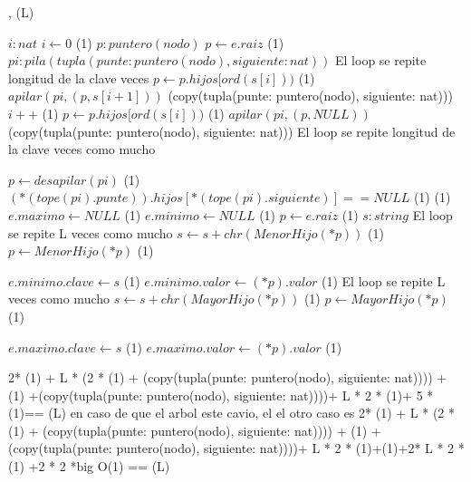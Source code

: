{   ,
    }
    {}
    {\bigo(L)}
{
	\var $i : nat$
	\State $ i \gets 0$  												\comment \bigo(1) 
	\var $p : puntero(nodo)$ 
	\State $ p \gets e.raiz$											\comment \bigo(1)  
	\var $pi: pila(tupla(punte: puntero(nodo), siguiente: nat))$ 
     	\Statex             \comment El loop se repite longitud de la clave veces
     	\State $p \gets p.hijos[ord(s[i]))$								\comment \bigo(1)
     	\State $apilar(pi, (p,s[i+1])) $								\comment \bigo(copy(tupla(punte: puntero(nodo), siguiente: nat))) 
     	\State $i++$   													\comment \bigo(1) 
    \EndWhile	
    \State $p \gets p.hijos[ord(s[i]))$								\comment \bigo(1)
     \State $apilar(pi, (p,NULL)) $							\comment \bigo(copy(tupla(punte: puntero(nodo), siguiente: nat)))	
     	\Statex             \comment El loop se repite longitud de la clave veces como mucho
 
     	\State $p \gets desapilar(pi)$								\comment \bigo(1)
     	  \State $(*(tope(pi).punte)).hijos[*(tope(pi).siguiente)] == NULL$							\comment \bigo(1)	
    \EndWhile	
                         			\comment \bigo(1)
		 	\State $e.maximo \gets NULL$							\comment \bigo(1)
	\State $e.minimo \gets NULL$							\comment \bigo(1)
	\Else
         \State $ p \gets e.raiz$	\comment \bigo(1)
         \var $s : string$ 
     		\Statex             \comment El loop se repite L veces como mucho
     		\State $s \gets s+chr(MenorHijo(*p))$								\comment \bigo(1)	
     		\State $p \gets MenorHijo(*p)$								\comment \bigo(1)	
     				
    	\EndWhile		
    	\State $e.minimo.clave \gets s$								\comment \bigo(1)	
    	\State $e.minimo.valor \gets (*p).valor$								\comment \bigo(1)	
     		\Statex             \comment El loop se repite L veces como mucho
     		\State $s \gets s+chr(MayorHijo(*p))$								\comment \bigo(1)	
     		\State $p \gets MayorHijo(*p)$								\comment \bigo(1)	
     				
    	\EndWhile		
    	\State $e.maximo.clave \gets s$								\comment \bigo(1)	
    	\State $e.maximo.valor \gets (*p).valor$								\comment \bigo(1)	
    	
     \EndIf	 	
												 

}	{  2* \bigo(1) + L * (2 * \bigo(1) + \bigo(copy(tupla(punte: puntero(nodo), siguiente: nat)))) + \bigo(1) +\bigo(copy(tupla(punte: puntero(nodo), siguiente: nat))))+ L * 2 * \bigo(1)+ 5 * \bigo(1)== \bigo(L) en caso de que el arbol este cavio, el el otro caso es 
2* \bigo(1) + L * (2 * \bigo(1) + \bigo(copy(tupla(punte: puntero(nodo), siguiente: nat)))) + \bigo(1) +\bigo(copy(tupla(punte: puntero(nodo), siguiente: nat))))+ L * 2 * \bigo(1)+\bigo(1)+2* L * 2 * \bigo(1) +2 * 2 *big O(1) == \bigo(L)}

